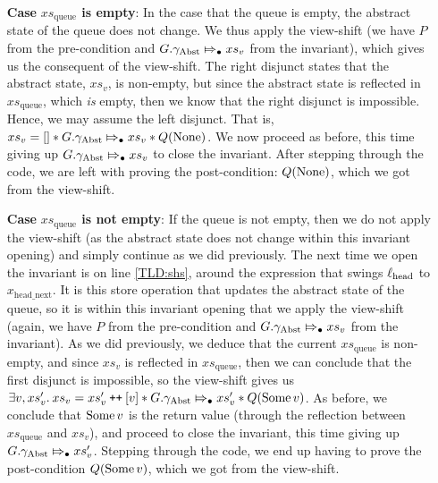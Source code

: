 \documentclass[a4paper, 10pt]{report}
\theoremstyle{definition}
\newcommand{\xsqueue}{xs_{\mathrm{queue}}}
\newcommand{\locN}[1]{\loc_{\mathrm{#1}}}
\newcommand{\lochead}{\locN{head}}
\newcommand{\node}{x}
\newcommand{\nodeN}[1]{\node_{\mathrm{#1}}}
\newcommand{\nodeheadnext}{\nodeN{head\_next}}
\newcommand{\absvalue}{\val}
\newcommand{\absvalueList}{xs_v}
\newcommand{\Qg}{G}
\newcommand{\gabst}{\gname_{\mathrm{Abst}}}
\newcommand\catenate{\mathbin{\text{\ttfamily\upshape ++}}}
\newcommand{\abstractstateauth}[2]{#1 \Mapsto_{\bullet} #2}
\begin{document}
\begin{itemize}
  \item[\textbf{Case}] \textbf{$\xsqueue$ is empty}:
  In the case that the queue is empty, the abstract state of the queue does not change. We thus apply the view-shift (we have $P$ from the pre-condition and $\abstractstateauth{\Qg.\gabst}{\absvalueList}$ from the invariant), which gives us the consequent of the view-shift. The right disjunct states that the abstract state, $\absvalueList$, is non-empty, but since the abstract state is reflected in $\xsqueue$, which \emph{is} empty, then we know that the right disjunct is impossible. Hence, we may assume the left disjunct. That is, $\absvalueList = [] \star{} \abstractstateauth{\Qg.\gabst}{\absvalueList} \star{} Q(\None)$. We now proceed as before, this time giving up $\abstractstateauth{\Qg.\gabst}{\absvalueList}$ to close the invariant. After stepping through the code, we are left with proving the post-condition: $Q(\operatorname{None})$, which we got from the view-shift.

  \item[\textbf{Case}] \textbf{$\xsqueue$ is not empty}:
  If the queue is not empty, then we do not apply the view-shift (as the abstract state does not change within this invariant opening) and simply continue as we did previously. The next time we open the invariant is on line \ref{TLD:shs}, around the expression that swings $\lochead$ to $\nodeheadnext$. It is this store operation that updates the abstract state of the queue, so it is within this invariant opening that we apply the view-shift (again, we have $P$ from the pre-condition and $\abstractstateauth{\Qg.\gabst}{\absvalueList}$ from the invariant). As we did previously, we deduce that the current $\xsqueue$ is non-empty, and since $\absvalueList$ is reflected in $\xsqueue$, then we can conclude that the first disjunct is impossible, so the view-shift gives us $\Exists \absvalue, \absvalueList' . \absvalueList = \absvalueList' \catenate [\absvalue] \star{} \abstractstateauth{\Qg.\gabst}{\absvalueList'} \star{} Q(\Some{\absvalue})$. As before, we conclude that $\Some{\absvalue}$ is the return value (through the reflection between $\xsqueue$ and $\absvalueList$), and proceed to close the invariant, this time giving up $\abstractstateauth{\Qg.\gabst}{\absvalueList'}$. Stepping through the code, we end up having to prove the post-condition $Q(\Some{\absvalue})$, which we got from the view-shift.
\end{itemize}

\end{document}

